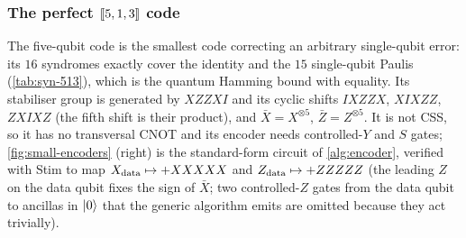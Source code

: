 \subsubsection{The perfect $\bits{5}{1}{3}$ code}
The five-qubit code \cite{laflamme96,bennett96} is the smallest code correcting an arbitrary single-qubit error: its $16$ syndromes exactly cover the identity and the $15$ single-qubit Paulis (\cref{tab:syn-513}), which is the quantum Hamming bound with equality. Its stabiliser group is generated by $XZZXI$ and its cyclic shifts $IXZZX$, $XIXZZ$, $ZXIXZ$ (the fifth shift is their product), and $\bar X=X^{\otimes5}$, $\bar Z=Z^{\otimes5}$. It is not CSS, so it has no transversal CNOT and its encoder needs controlled-$Y$ and $S$ gates; \cref{fig:small-encoders} (right) is the standard-form circuit of \cref{alg:encoder}, verified with Stim to map $X_{\rm data}\mapsto+XXXXX$ and $Z_{\rm data}\mapsto+ZZZZZ$ (the leading $Z$ on the data qubit fixes the sign of $\bar X$; two controlled-$Z$ gates from the data qubit to ancillas in $\lvert 0 \rangle$ that the generic algorithm emits are omitted because they act trivially).

\begin{table}[H]\centering\scriptsize

\caption{$\bits{5}{1}{3}$ lookup table (computed) for generators $S_1=XZZXI$, $S_2=IXZZX$, $S_3=XIXZZ$, $S_4=ZXIXZ$: every one of the $15$ single-qubit errors has a distinct non-zero syndrome.}
\label{tab:syn-513}
\end{table}


